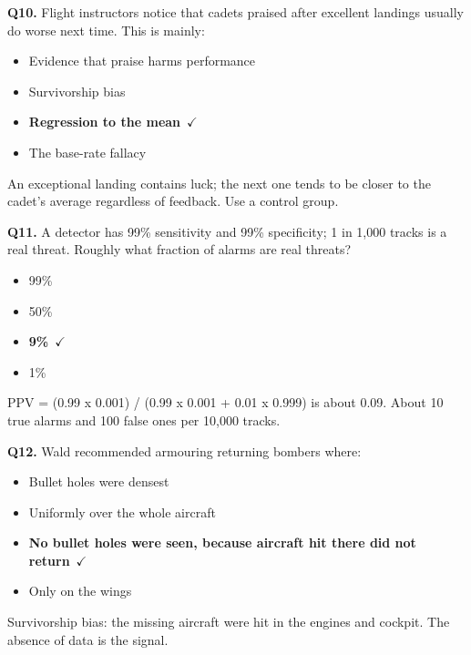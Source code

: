 \documentclass[11pt]{article}
\begin{document}
{\noindent\textbf{Q10.} Flight instructors notice that cadets praised after excellent landings usually do worse next time. This is mainly:\begin{itemize}[leftmargin=2.2em,itemsep=0pt,topsep=1pt]\item[A.] Evidence that praise harms performance\item[B.] Survivorship bias\item[\textbf{C.}] \textbf{Regression to the mean}~{\color{GrnN}$\checkmark$}\item[D.] The base-rate fallacy\end{itemize} An exceptional landing contains luck; the next one tends to be closer to the cadet's average regardless of feedback. Use a control group.\par\medskip

\noindent\textbf{Q11.} A detector has 99\% sensitivity and 99\% specificity; 1 in 1,000 tracks is a real threat. Roughly what fraction of alarms are real threats?\begin{itemize}[leftmargin=2.2em,itemsep=0pt,topsep=1pt]\item[A.] 99\%\item[B.] 50\%\item[\textbf{C.}] \textbf{9\%}~{\color{GrnN}$\checkmark$}\item[D.] 1\%\end{itemize} PPV = (0.99 x 0.001) / (0.99 x 0.001 + 0.01 x 0.999) is about 0.09. About 10 true alarms and 100 false ones per 10,000 tracks.\par\medskip

\noindent\textbf{Q12.} Wald recommended armouring returning bombers where:\begin{itemize}[leftmargin=2.2em,itemsep=0pt,topsep=1pt]\item[A.] Bullet holes were densest\item[B.] Uniformly over the whole aircraft\item[\textbf{C.}] \textbf{No bullet holes were seen, because aircraft hit there did not return}~{\color{GrnN}$\checkmark$}\item[D.] Only on the wings\end{itemize} Survivorship bias: the missing aircraft were hit in the engines and cockpit. The absence of data is the signal.\par\medskip

}
\end{document}
